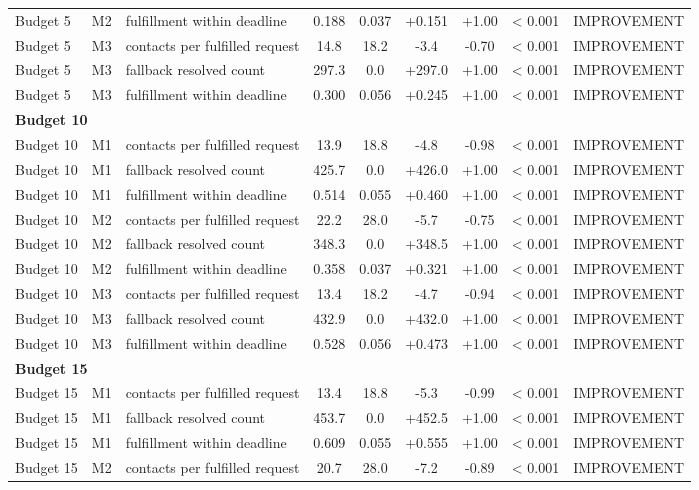 \begin{table}[t]
\begin{tabular}{lllcccccl}
Budget 5 & M2 & fulfillment within deadline & 0.188 & 0.037 & +0.151 & +1.00 & < 0.001 & IMPROVEMENT \\
Budget 5 & M3 & contacts per fulfilled request & 14.8 & 18.2 & -3.4 & -0.70 & < 0.001 & IMPROVEMENT \\
Budget 5 & M3 & fallback resolved count & 297.3 & 0.0 & +297.0 & +1.00 & < 0.001 & IMPROVEMENT \\
Budget 5 & M3 & fulfillment within deadline & 0.300 & 0.056 & +0.245 & +1.00 & < 0.001 & IMPROVEMENT \\
\midrule
\multicolumn{9}{l}{\textbf{Budget 10}} \\
\midrule
Budget 10 & M1 & contacts per fulfilled request & 13.9 & 18.8 & -4.8 & -0.98 & < 0.001 & IMPROVEMENT \\
Budget 10 & M1 & fallback resolved count & 425.7 & 0.0 & +426.0 & +1.00 & < 0.001 & IMPROVEMENT \\
Budget 10 & M1 & fulfillment within deadline & 0.514 & 0.055 & +0.460 & +1.00 & < 0.001 & IMPROVEMENT \\
Budget 10 & M2 & contacts per fulfilled request & 22.2 & 28.0 & -5.7 & -0.75 & < 0.001 & IMPROVEMENT \\
Budget 10 & M2 & fallback resolved count & 348.3 & 0.0 & +348.5 & +1.00 & < 0.001 & IMPROVEMENT \\
Budget 10 & M2 & fulfillment within deadline & 0.358 & 0.037 & +0.321 & +1.00 & < 0.001 & IMPROVEMENT \\
Budget 10 & M3 & contacts per fulfilled request & 13.4 & 18.2 & -4.7 & -0.94 & < 0.001 & IMPROVEMENT \\
Budget 10 & M3 & fallback resolved count & 432.9 & 0.0 & +432.0 & +1.00 & < 0.001 & IMPROVEMENT \\
Budget 10 & M3 & fulfillment within deadline & 0.528 & 0.056 & +0.473 & +1.00 & < 0.001 & IMPROVEMENT \\
\midrule
\multicolumn{9}{l}{\textbf{Budget 15}} \\
\midrule
Budget 15 & M1 & contacts per fulfilled request & 13.4 & 18.8 & -5.3 & -0.99 & < 0.001 & IMPROVEMENT \\
Budget 15 & M1 & fallback resolved count & 453.7 & 0.0 & +452.5 & +1.00 & < 0.001 & IMPROVEMENT \\
Budget 15 & M1 & fulfillment within deadline & 0.609 & 0.055 & +0.555 & +1.00 & < 0.001 & IMPROVEMENT \\
Budget 15 & M2 & contacts per fulfilled request & 20.7 & 28.0 & -7.2 & -0.89 & < 0.001 & IMPROVEMENT \\

\end{tabular}
\end{table}

